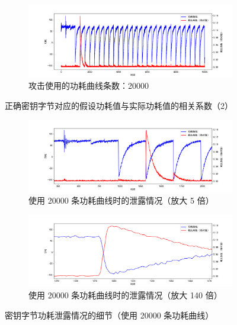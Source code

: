 \begin{figure}[htbp]
\begin{subfigure}{1.0\textwidth}
        \includegraphics[height=.21\textheight, width=1.0\textwidth]{../images/leakage_20000.png}
        \caption{攻击使用的功耗曲线条数：20000}
    \end{subfigure}

    \caption{正确密钥字节对应的假设功耗值与实际功耗值的相关系数（2）}
\end{figure}

\begin{figure}[htbp]
    \centering
    \begin{subfigure}{1.0\textwidth}
        \includegraphics[height=.25\textheight, width=1.0\textwidth]{../images/leakage_20000_zoom_1.png}
        \caption{使用 20000 条功耗曲线时的泄露情况（放大 5 倍）}
    \end{subfigure}
    \begin{subfigure}{1.0\textwidth}
        \includegraphics[height=.25\textheight, width=1.0\textwidth]{../images/leakage_20000_zoom_2.png}
        \caption{使用 20000 条功耗曲线时的泄露情况（放大 140 倍）}
    \end{subfigure}

    \caption{密钥字节功耗泄露情况的细节（使用 20000 条功耗曲线）}
    \label{fig:leakage_zoom}
\end{figure}